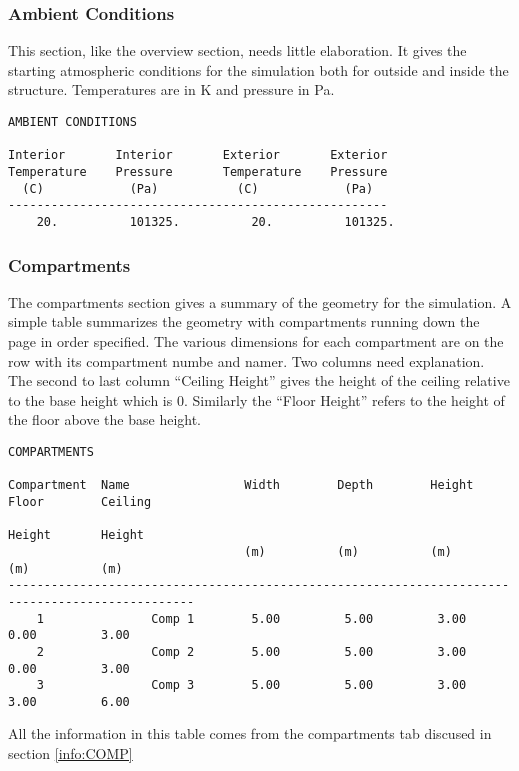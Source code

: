 \subsubsection{Ambient Conditions}

This section, like the overview section, needs little elaboration.  It gives the starting atmospheric conditions for the simulation both for outside and inside the structure. Temperatures are in K and pressure in Pa.
\begin{lstlisting}[basicstyle=\tiny]
AMBIENT CONDITIONS

Interior       Interior       Exterior       Exterior
Temperature    Pressure       Temperature    Pressure
  (C)            (Pa)           (C)            (Pa)
-----------------------------------------------------
    20.          101325.          20.          101325.
\end{lstlisting}

\subsubsection{Compartments}
The compartments section gives a summary of the geometry for the simulation.  A simple table summarizes the geometry with compartments running down the page in order specified.  The various dimensions for each compartment are on the row with its compartment numbe and namer.  Two columns need explanation.  The second to last column ``Ceiling Height'' gives the height of the ceiling relative to the base height which is 0.  Similarly the ``Floor Height'' refers to the height of the floor above the base height.

\begin{lstlisting}[basicstyle=\tiny]
COMPARTMENTS

Compartment  Name                Width        Depth        Height       Floor        Ceiling
                                                                        Height       Height
                                 (m)          (m)          (m)          (m)          (m)
------------------------------------------------------------------------------------------------
    1               Comp 1        5.00         5.00         3.00         0.00         3.00
    2               Comp 2        5.00         5.00         3.00         0.00         3.00
    3               Comp 3        5.00         5.00         3.00         3.00         6.00
\end{lstlisting}
All the information in this table comes from the compartments tab discused in section  \ref{info:COMP}


